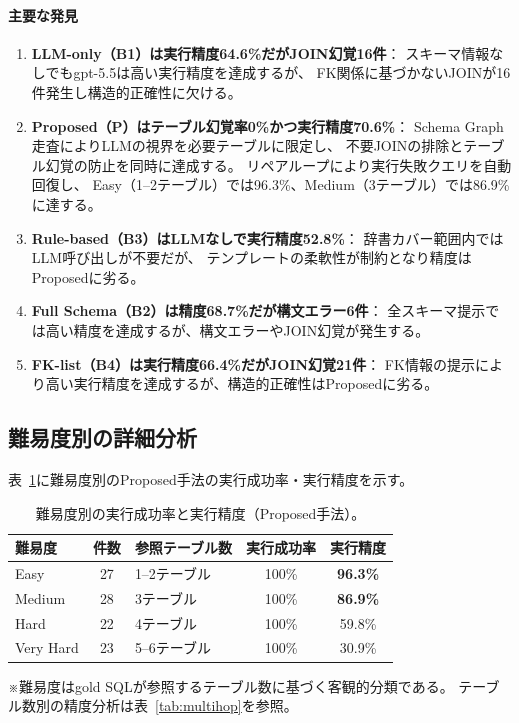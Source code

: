 \documentclass[5p,twocolumn]{elsarticle}
\begin{document}
\paragraph{主要な発見}

\begin{enumerate}
  \item \textbf{LLM-only（B1）は実行精度64.6\%だがJOIN幻覚16件}：
    スキーマ情報なしでもgpt-5.5は高い実行精度を達成するが、
    FK関係に基づかないJOINが16件発生し構造的正確性に欠ける。
  \item \textbf{Proposed（P）はテーブル幻覚率0\%かつ実行精度70.6\%}：
    Schema Graph走査によりLLMの視界を必要テーブルに限定し、
    不要JOINの排除とテーブル幻覚の防止を同時に達成する。
    リペアループにより実行失敗クエリを自動回復し、
    Easy（1--2テーブル）では96.3\%、Medium（3テーブル）では86.9\%に達する。
  \item \textbf{Rule-based（B3）はLLMなしで実行精度52.8\%}：
    辞書カバー範囲内ではLLM呼び出しが不要だが、
    テンプレートの柔軟性が制約となり精度はProposedに劣る。
  \item \textbf{Full Schema（B2）は精度68.7\%だが構文エラー6件}：
    全スキーマ提示では高い精度を達成するが、構文エラーやJOIN幻覚が発生する。
  \item \textbf{FK-list（B4）は実行精度66.4\%だがJOIN幻覚21件}：
    FK情報の提示により高い実行精度を達成するが、構造的正確性はProposedに劣る。
\end{enumerate}

\subsection{難易度別の詳細分析}

表~\ref{tab:difficulty_breakdown}に難易度別のProposed手法の実行成功率・実行精度を示す。

\begin{table}[htbp]
  \centering
  \caption{難易度別の実行成功率と実行精度（Proposed手法）。}
  \label{tab:difficulty_breakdown}
  \small
  \begin{tabular}{lclcc}
    \toprule
    難易度 & 件数 & 参照テーブル数 & 実行成功率 & 実行精度 \\
    \midrule
    Easy & 27 & 1--2テーブル & 100\% & \textbf{96.3\%} \\
    Medium & 28 & 3テーブル & 100\% & \textbf{86.9\%} \\
    Hard & 22 & 4テーブル & 100\% & 59.8\% \\
    Very Hard & 23 & 5--6テーブル & 100\% & 30.9\% \\
    \bottomrule
  \end{tabular}
  \vspace{2pt}
  \parbox{\linewidth}{\scriptsize
    ※難易度はgold SQLが参照するテーブル数に基づく客観的分類である。
    テーブル数別の精度分析は表~\ref{tab:multihop}を参照。}
\end{table}
\end{document}
